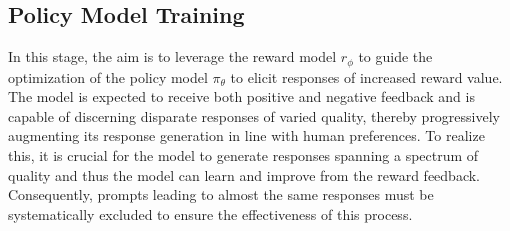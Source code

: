 \begin{table}[]
\centering
\caption{Stat. of human preference data for reward training. 
}
\vspace{-2mm}
\label{tab:reward-model-statistic}
\end{table}

\subsection{Policy Model Training}
In this stage, the aim is to leverage the reward model $r_{\phi}$ to guide the optimization of the policy model $\pi_{\theta}$ to elicit responses of increased reward value. The model is expected to receive both positive and negative feedback and is capable of discerning disparate responses of varied quality, thereby progressively augmenting its response generation in line with human preferences. To realize this, it is crucial for the model to generate responses spanning a spectrum of quality and thus the model can learn and improve from the reward feedback. Consequently, prompts leading to almost the same responses must be systematically excluded to ensure the effectiveness of this process.

